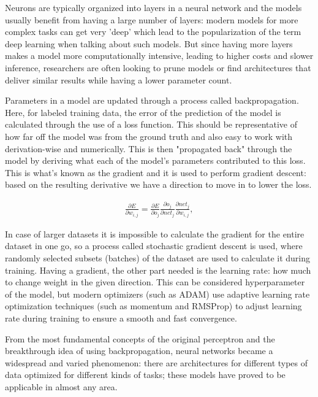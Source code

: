 	Neurons are typically organized into layers in a neural network and the models usually benefit from having a large number of layers: modern models for more complex tasks can get very 'deep' which lead to the popularization of the term deep learning when talking about such models. But since having more layers makes a model more computationally intensive, leading to higher costs and slower inference, researchers are often looking to prune models or find architectures that deliver similar results while having a lower parameter count.
	
	Parameters in a model are updated through a process called backpropagation. Here, for labeled training data, the error of the prediction of the model is calculated through the use of a loss function. This should be representative of how far off the model was from the ground truth and also easy to work with derivation-wise and numerically. This is then "propagated back" through the model by deriving what each of the model's parameters contributed to this loss. This is what's known as the gradient and it is used to perform gradient descent: based on the resulting derivative we have a direction to move in to lower the loss.
	
	
	\begin{align}
		\frac{\partial{E}}{\partial{w_{i,j}}} = \frac{\partial{E}}{\partial{o_j}}\frac{\partial{o_j}}{\partial{net_j}}\frac{\partial{net_j}}{\partial{w_{i,j}}},
	\end{align}
	
	
	In case of larger datasets it is impossible to calculate the gradient for the entire dataset in one go, so a process called stochastic gradient descent is used, where randomly selected subsets (batches) of the dataset are used to calculate it during training. Having a gradient, the other part needed is the learning rate: how much to change weight in the given direction. This can be considered hyperparameter of the model, but modern optimizers (such as ADAM) use adaptive learning rate optimization techniques (such as momentum and RMSProp) to adjust learning rate during training to ensure a smooth and fast convergence.
	
	From the most fundamental concepts of the original perceptron and the breakthrough idea of using backpropagation, neural networks became a widespread and varied phenomenon: there are architectures for different types of data optimized for different kinds of tasks; these models have proved to be applicable in almost any area.
	
